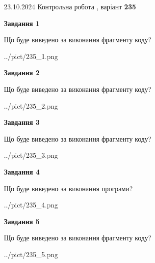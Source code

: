 \documentclass[12pt, ukrainian]{article}
\begin{document}
{\Large{23.10.2024 Контрольна робота , варіант  \No \textbf { 235 }\par}}
{
\begin {large}
{\begin {center}\textbf{Завдання 1}\end {center}}

Що буде виведено за виконання фрагменту коду?\par
\begin{center}
	{../pict/235_1.png}
\end{center}
\newpage

{\begin {center}\textbf{Завдання 2}\end {center}}

Що буде виведено за виконання фрагменту коду?\par
\begin{center}
	{../pict/235_2.png}
\end{center}
\newpage

{\begin {center}\textbf{Завдання 3}\end {center}}

Що буде виведено за виконання фрагменту коду?\par
\begin{center}
	{../pict/235_3.png}
\end{center}
\newpage

{\begin {center}\textbf{Завдання 4}\end {center}}

Що буде виведено за виконання програми?\par
\begin{center}
	{../pict/235_4.png}
\end{center}
\newpage

{\begin {center}\textbf{Завдання 5}\end {center}}

Що буде виведено за виконання фрагменту коду?\par
\begin{center}
	{../pict/235_5.png}
\end{center}
\newpage


\end{large}}
\end{document}
